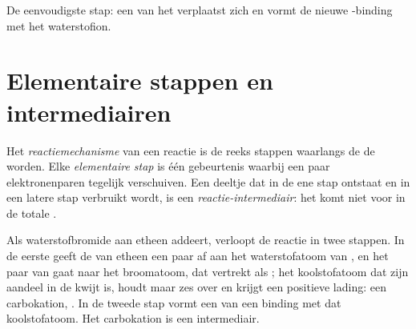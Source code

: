\begin{omfigure}
\qquad\raisebox{0.2ex}{$+$}\qquad
{}
\qquad\raisebox{0.2ex}{$\longrightarrow$}\qquad
{}

{\small De eenvoudigste stap: een  van het
 verplaatst zich en vormt de nieuwe -binding met het
waterstofion.}
\end{omfigure}

\section{Elementaire stappen en intermediairen}

\begin{definition}\label{def:g12:curly-arrows:mechanism}
Het \emph{reactiemechanisme} van een reactie is
de reeks stappen waarlangs de  de  worden.
Elke \emph{elementaire stap} is één gebeurtenis
waarbij een paar elektronenparen tegelijk verschuiven. Een deeltje dat in
de ene stap ontstaat en in een latere stap verbruikt wordt, is een
\emph{reactie-intermediair}:
het komt niet voor in de totale .
\end{definition}


\begin{example}\label{ex:g12:curly-arrows:carbocation}
Als waterstofbromide aan etheen addeert, verloopt de reactie in twee
stappen. In de eerste geeft de  van etheen een paar af aan
het waterstofatoom van , en het paar van  gaat naar het
broomatoom, dat vertrekt als ; het koolstofatoom dat zijn aandeel
in de  kwijt is, houdt maar zes  over en krijgt
een positieve lading: een carbokation,
. In de tweede stap vormt een  van
 een binding met dat koolstofatoom. Het carbokation is een
intermediair.
\end{example}

